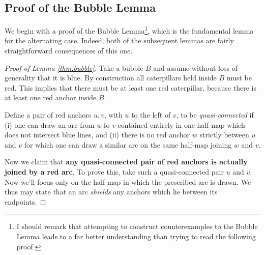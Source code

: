 \subsection{Proof of the Bubble Lemma}
We begin with a proof of the Bubble Lemma\footnote{I should remark that attempting to construct counterexamples to the Bubble Lemma leads to a far better understanding than trying to read the following proof.}, which is the fundamental lemma for the alternating case.  Indeed, both of the subsequent lemmas are fairly straightforward consequences of this one.  

\begin{proof}[Proof of Lemma \ref{thm:bubble}]
	Take a bubble $B$ and assume without loss of generality that it is blue.  By construction all caterpillars held inside $B$ must be red.  This implies that there must be at least one red caterpillar, because there is at least one red anchor inside $B$.

	Define a pair of red anchors $u, v$, with $u$ to the left of $v$, to be \emph{quasi-connected} if (i) one can draw an arc from $u$ to $v$ contained entirely in one half-map which does not intersect blue lines, and (ii) there is no red anchor $w$ strictly between $u$ and $v$ for which one can draw a similar arc on the same half-map joining $w$ and $v$.

	Now we claim that \textbf{any quasi-connected pair of red anchors is actually joined by a red arc}.  To prove this, take such a quasi-connected pair $u$ and $v$.  Now we'll focus only on the half-map in which the prescribed arc is drawn.  We thus may state that an arc \emph{shields} any anchors which lie between its endpoints.
	

\end{proof}

